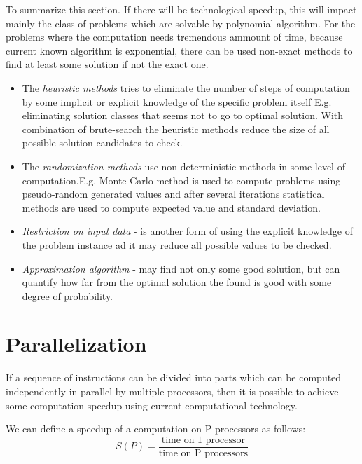 To summarize this section. If there will be technological speedup, this will impact mainly the class of problems which are solvable by polynomial algorithm. For the problems where the computation needs tremendous ammount of time, because current known algorithm is exponential, there can be used non-exact methods to find at least some solution if not the exact one. 
\begin{itemize}
\item{The \emph{heuristic methods} tries to eliminate the number of steps of computation by some implicit or explicit knowledge of the specific problem itself E.g. eliminating solution classes that seems not to go to optimal solution. With combination of brute-search the heuristic methods reduce the size of all possible solution candidates to check.}
\item{The \emph{randomization methods} use non-deterministic methods in some level of computation.E.g. Monte-Carlo method is used to compute problems using pseudo-random generated values and after several iterations statistical methods are used to compute expected value and standard deviation. }
\item{\emph{Restriction on input data} - is another form of using the explicit knowledge of the problem instance ad it may reduce all possible values to be checked. }
\item{\emph{Approximation algorithm} - may find not only some good solution, but can quantify how far from the optimal solution the found is good with some degree of probability.}
\end{itemize}


\section{Parallelization}
\label{sec:introparalel}

If a sequence of instructions can be divided into parts which  can be computed independently in parallel by multiple processors, then it is possible to achieve some computation speedup using current computational technology. %

We can define a speedup of a computation on P processors as follows:
\begin{equation}\label{eq:speedup}
 S(P) = \frac{\text{time on 1 processor}}{\text{time on P processors}}
 \end{equation}

